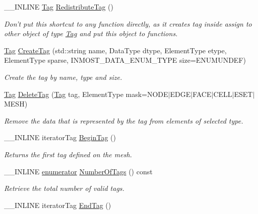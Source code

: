 \begin{DoxyCompactItemize}
\item 
\-\_\-\-\_\-\-I\-N\-L\-I\-N\-E \hyperlink{classINMOST_1_1Tag}{Tag} \hyperlink{classINMOST_1_1Mesh_a1cd4e1b35b122a5cfc24d6d74229b81b}{Redistribute\-Tag} ()
\begin{DoxyCompactList}\small\item\em Don't put this shortcut to any function directly, as it creates tag inside assign to other object of type \hyperlink{classINMOST_1_1Tag}{Tag} and put this object to functions. \end{DoxyCompactList}\item 
\hyperlink{classINMOST_1_1Tag}{Tag} \hyperlink{classINMOST_1_1Mesh_a02d7bfbdaa069199d3f8b3c3e9e7f151}{Create\-Tag} (std\-::string name, Data\-Type dtype, Element\-Type etype, Element\-Type sparse, I\-N\-M\-O\-S\-T\-\_\-\-D\-A\-T\-A\-\_\-\-E\-N\-U\-M\-\_\-\-T\-Y\-P\-E size=E\-N\-U\-M\-U\-N\-D\-E\-F)
\begin{DoxyCompactList}\small\item\em Create the tag by name, type and size. \end{DoxyCompactList}\item 
\hyperlink{classINMOST_1_1Tag}{Tag} \hyperlink{classINMOST_1_1Mesh_ae43e132d6fd14903e263f00fbcffec51}{Delete\-Tag} (\hyperlink{classINMOST_1_1Tag}{Tag} tag, Element\-Type mask=N\-O\-D\-E$|$E\-D\-G\-E$|$F\-A\-C\-E$|$C\-E\-L\-L$|$E\-S\-E\-T$|$M\-E\-S\-H)
\begin{DoxyCompactList}\small\item\em Remove the data that is represented by the tag from elements of selected type. \end{DoxyCompactList}\item 
\-\_\-\-\_\-\-I\-N\-L\-I\-N\-E iterator\-Tag \hyperlink{classINMOST_1_1Mesh_a2922f80c6c522500a887fe115cf5271d}{Begin\-Tag} ()
\begin{DoxyCompactList}\small\item\em Returns the first tag defined on the mesh. \end{DoxyCompactList}\item 
\-\_\-\-\_\-\-I\-N\-L\-I\-N\-E \hyperlink{classINMOST_1_1Storage_ae333dfced6fa9cfde0c8e7dcf1b0cc2b}{enumerator} \hyperlink{classINMOST_1_1Mesh_a05939bf3f29697b1ffb2005a617ee585}{Number\-Of\-Tags} () const 
\begin{DoxyCompactList}\small\item\em Retrieve the total number of valid tags. \end{DoxyCompactList}\item 
\-\_\-\-\_\-\-I\-N\-L\-I\-N\-E iterator\-Tag \hyperlink{classINMOST_1_1Mesh_ae69466c97ab50182ba143df2a76d5d9f}{End\-Tag} ()

\end{DoxyCompactItemize}
